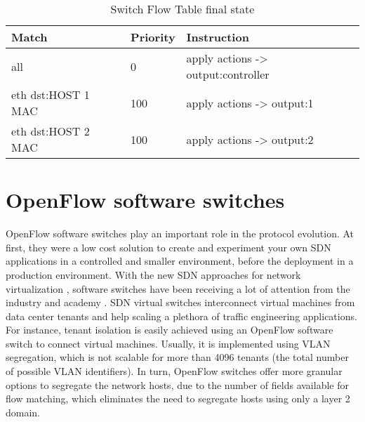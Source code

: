 \begin{enumerate}
\begin{table}[h]
\centering
\caption{Switch Flow Table final state}
\label{tab:finaltable}
\begin{tabular}{|l|l|l|}
\hline
\textbf{Match}                 & \textbf{Priority}   & \textbf{Instruction}                              \\ \hline
all                            & 0                   & apply actions -> output:controller                \\ \hline
eth dst:HOST 1 MAC             & 100                 & apply actions -> output:1                         \\ \hline
eth dst:HOST 2 MAC             & 100                 & apply actions -> output:2                         \\ \hline
\end{tabular}
\end{table}


\end{enumerate}        

\section{OpenFlow software switches}
\label{sec:sec22}

OpenFlow software switches play an important role in the protocol evolution. At first, they were a low cost solution to create and experiment your own SDN applications in a controlled and smaller environment, before the deployment in a production environment. With the new SDN approaches for network virtualization \cite{Tseng:2011:NVC:2117686.2118540} \cite{Drutskoy_scalablenetwork}, software switches have been receiving a lot of attention from the industry \cite{NSX} and academy \cite{DBLP:confcloudnetEmmerichRWC14}. SDN virtual switches interconnect virtual machines from data center tenants and help scaling a plethora of traffic engineering applications. For instance, tenant isolation is easily achieved using an OpenFlow software switch to connect virtual machines. Usually, it is implemented using VLAN segregation, which is not scalable for more than 4096 tenants (the total number of possible VLAN identifiers). In turn, OpenFlow switches offer more granular options to segregate the network hosts, due to the number of fields available for flow matching, which eliminates the need to segregate hosts using only a layer 2 domain.

